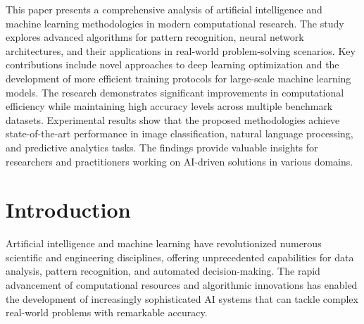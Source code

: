 \documentclass[twocolumn]{article}
\begin{document}

This paper presents a comprehensive analysis of artificial intelligence and machine learning methodologies in modern computational research. The study explores advanced algorithms for pattern recognition, neural network architectures, and their applications in real-world problem-solving scenarios. Key contributions include novel approaches to deep learning optimization and the development of more efficient training protocols for large-scale machine learning models. The research demonstrates significant improvements in computational efficiency while maintaining high accuracy levels across multiple benchmark datasets. Experimental results show that the proposed methodologies achieve state-of-the-art performance in image classification, natural language processing, and predictive analytics tasks. The findings provide valuable insights for researchers and practitioners working on AI-driven solutions in various domains.

\section{Introduction}

Artificial intelligence and machine learning have revolutionized numerous scientific and engineering disciplines, offering unprecedented capabilities for data analysis, pattern recognition, and automated decision-making. The rapid advancement of computational resources and algorithmic innovations has enabled the development of increasingly sophisticated AI systems that can tackle complex real-world problems with remarkable accuracy.
\end{document}
